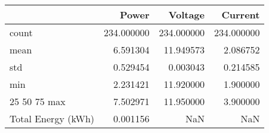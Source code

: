 \begin{tabular}{lrrr}
\toprule
 & Power & Voltage & Current \\
\midrule
count & 234.000000 & 234.000000 & 234.000000 \\
mean & 6.591304 & 11.949573 & 2.086752 \\
std & 0.529454 & 0.003043 & 0.214585 \\
min & 2.231421 & 11.920000 & 1.900000 \\
25%
50%
75%
max & 7.502971 & 11.950000 & 3.900000 \\
Total Energy (kWh) & 0.001156 & NaN & NaN \\
\bottomrule
\end{tabular}
